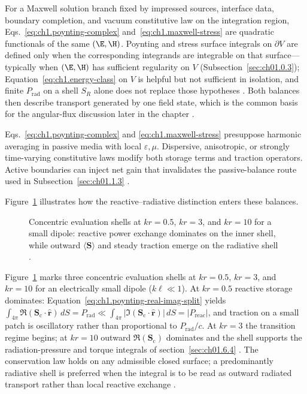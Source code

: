 \label{prop:ch1.energy-momentum-consistency}
For a Maxwell solution branch fixed by impressed sources, interface data, boundary completion, and vacuum constitutive law on the integration region, Eqs.~\eqref{eq:ch1.poynting-complex} and~\eqref{eq:ch1.maxwell-stress} are quadratic functionals of the same \((\E,\H)\). Poynting and stress surface integrals on \(\partial V\) are defined only when the corresponding integrands are integrable on that surface---typically when \((\E,\H)\) has sufficient regularity on \(V\) (Subsection~\ref{sec:ch01.0.3}); Equation~\eqref{eq:ch1.energy-class} on \(V\) is helpful but not sufficient in isolation, and finite \(P_{\mathrm{rad}}\) on a shell \(S_R\) alone does not replace those hypotheses \cite{stratton1941}. Both balances then describe transport generated by one field state, which is the common basis for the angular-flux discussion later in the chapter \cite{stratton1941}.

Eqs.~\eqref{eq:ch1.poynting-complex} and
\eqref{eq:ch1.maxwell-stress} presuppose harmonic averaging in passive media with
local \(\varepsilon,\mu\). Dispersive, anisotropic, or strongly time-varying
constitutive laws modify both storage terms and traction operators. Active boundaries
can inject net gain that invalidates the passive-balance route used in
Subsection~\ref{sec:ch01.1.3}
\cite{stratton1941}.



Figure~\ref{fig:ch1.wp-reactive-vs-radiative} illustrates how the reactive--radiative distinction enters these balances.
\begin{figure}[!htbp]
\centering
\VolIPhysFig{\VolIPhysReactiveVsRadiative}
\caption{Concentric evaluation shells at $kr=0.5$, $kr=3$, and $kr=10$ for a small dipole: reactive power exchange dominates on the inner shell, while outward $\langle\mathbf{S}\rangle$ and steady traction emerge on the radiative shell \cite{stratton1941,chu1948}.}
\label{fig:ch1.wp-reactive-vs-radiative}
\end{figure}

Figure~\ref{fig:ch1.wp-reactive-vs-radiative} marks three concentric evaluation shells at $kr=0.5$, $kr=3$, and $kr=10$ for an electrically small dipole ($k\ell\ll1$). At $kr=0.5$ reactive
storage dominates: Equation~\eqref{eq:ch1.poynting-real-imag-split} yields
\(\int_{4\pi}\Re(\mathbf{S}_\mathrm{c}\cdot\hat{\mathbf{r}})\,dS=P_{\mathrm{rad}}\ll
\int_{4\pi}|\Im(\mathbf{S}_\mathrm{c}\cdot\hat{\mathbf{r}})|\,dS=|P_{\mathrm{reac}}|\), and traction on a
small patch is oscillatory rather than proportional to \(P_{\mathrm{rad}}/c\). At
$kr=3$ the transition regime begins; at
$kr=10$ outward $\Re(\mathbf{S}_\mathrm{c})$ dominates and the shell supports the radiation-pressure and torque integrals of section~\ref{sec:ch01.6.4} \cite{stratton1941,chu1948}.
The conservation law holds on any admissible closed surface; a predominantly radiative shell is preferred when the integral is to be read as outward radiated transport rather than local reactive exchange \cite{chu1948,stratton1941}.

